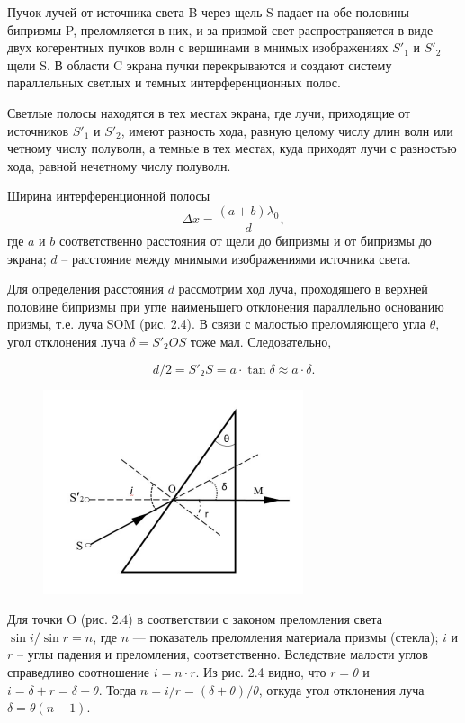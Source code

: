 Пучок лучей от источника света B через щель S падает на обе половины бипризмы P, преломляется в них, и за призмой свет распространяется в виде двух когерентных пучков волн с вершинами в мнимых изображениях ${S'}_{1}$ и ${S'}_{2}$ щели S. В области C экрана пучки перекрываются и создают систему параллельных светлых и темных интерференционных полос.

Светлые полосы находятся в тех местах экрана, где лучи, приходящие от источников ${S'}_{1}$ и ${S'}_{2}$, имеют разность хода, равную целому числу длин волн или четному числу полуволн, а темные в тех местах, куда приходят лучи с разностью хода, равной нечетному числу полуволн.

Ширина интерференционной полосы
\begin{equation}
    \Delta x = \frac{(a+b)\lambda_{0}}{d},
\end{equation}
где $a$ и $b$ соответственно расстояния от щели до бипризмы и от бипризмы до экрана; $d$ -- расстояние между мнимыми изображениями источника света.

Для определения расстояния $d$ рассмотрим ход луча, проходящего в верхней половине бипризмы при угле наименьшего отклонения параллельно основанию призмы, т.е. луча SOM (рис. 2.4). В связи с малостью преломляющего угла $\theta$, угол отклонения луча $\delta = {S'}_{2}OS$ тоже мал. Следовательно,

\begin{equation}
    d/2 = {S'}_{2}S = a \cdot \tan \delta \approx a \cdot \delta.
\end{equation}

\begin{figure}[H]
    \centering
    \includegraphics[width=0.5\linewidth]{figs/image.png}
\end{figure}

Для точки O (рис. 2.4) в соответствии с законом преломления света $\sin i / \sin r = n$, где $n$ — показатель преломления материала призмы (стекла); $i$ и $r$ -- углы падения и преломления, соответственно. Вследствие малости углов справедливо соотношение $i = n \cdot r$. Из рис. 2.4 видно, что $r = \theta$ и $i = \delta + r = \delta + \theta$. Тогда $n = i/r = (\delta + \theta) / \theta$, откуда угол отклонения луча $\delta = \theta(n-1)$.

